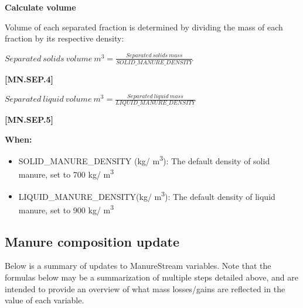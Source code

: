 \begin{refsection}
\textbf{Calculate volume}
\vspace{0.2cm}

Volume of each separated fraction is determined by dividing the mass of each fraction by its respective density:
         \vspace{0.2cm}

    \begin{center}
\(Separated\ solids\ volume\ m^3  = \frac{Separated\ solids\ mass}{SOLID\_MANURE\_DENSITY} \)

    \end{center}
        \vspace{0.5cm} 
    
            {\raggedleft \textbf{[MN.SEP.4]}\par}
            \vspace{0.5cm}

    \begin{center}

\(Separated\ liquid\ volume\ m^3 = \frac{Separated\ liquid\ mass}{LIQUID\_MANURE\_DENSITY} \)
    \end{center}
        \vspace{0.5cm} 
    
            {\raggedleft \textbf{[MN.SEP.5]}\par}
            \vspace{0.5cm}

\textbf{When:}
    \begin{itemize}
        \item SOLID\_MANURE\_DENSITY (kg/ m\textsuperscript{3}): The default density of solid manure, set to 700 kg/ m\textsuperscript{3}\\
        \item LIQUID\_MANURE\_DENSITY(kg/ m\textsuperscript{3}): The default density of liquid manure, set to 900 kg/ m\textsuperscript{3}\\
    \end{itemize}
    \vspace{0.2cm}

\subsection{Manure composition update}
\vspace{0.2cm}

Below is a summary of updates to ManureStream variables. Note that the formulas below may be a summarization of multiple steps detailed above, and are intended to provide an overview of what mass losses/gains are reflected in the value of each variable.


\end{refsection}
